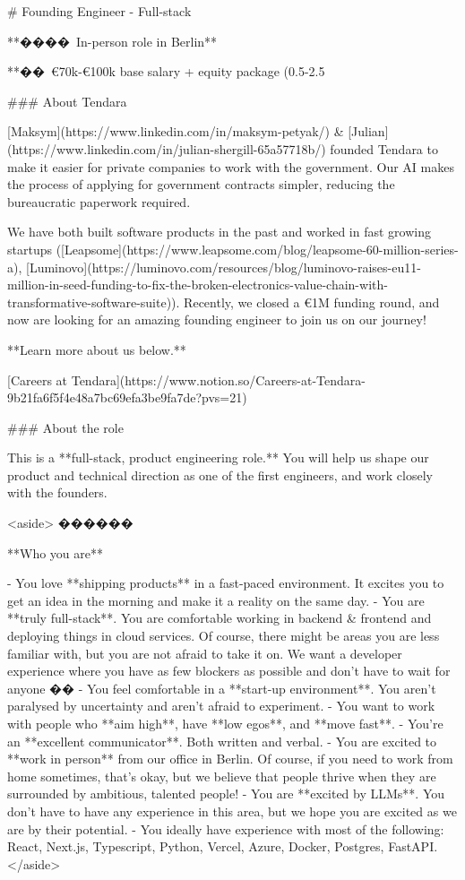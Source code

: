 # Founding Engineer - Full-stack

**���� In-person role in Berlin**

**�� €70k-€100k base salary + equity package (0.5-2.5%

### About Tendara

[Maksym](https://www.linkedin.com/in/maksym-petyak/) & [Julian](https://www.linkedin.com/in/julian-shergill-65a57718b/) founded Tendara to make it easier for private companies to work with the government. Our AI makes the process of applying for government contracts simpler, reducing the bureaucratic paperwork required.

We have both built software products in the past and worked in fast growing startups ([Leapsome](https://www.leapsome.com/blog/leapsome-60-million-series-a), [Luminovo](https://luminovo.com/resources/blog/luminovo-raises-eu11-million-in-seed-funding-to-fix-the-broken-electronics-value-chain-with-transformative-software-suite)). Recently, we closed a €1M funding round, and now are looking for an amazing founding engineer to join us on our journey!

**Learn more about us below.**

[Careers at Tendara](https://www.notion.so/Careers-at-Tendara-9b21fa6f5f4e48a7bc69efa3be9fa7de?pvs=21)

### About the role

This is a **full-stack, product engineering role.** You will help us shape our product and technical direction as one of the first engineers, and work closely with the founders. 

<aside>
����‍��

**Who you are**

- You love **shipping products** in a fast-paced environment. It excites you to get an idea in the morning and make it a reality on the same day.
- You are **truly full-stack**. You are comfortable working in backend & frontend and deploying things in cloud services. Of course, there might be areas you are less familiar with, but you are not afraid to take it on. We want a developer experience where you have as few blockers as possible and don’t have to wait for anyone ��
- You feel comfortable in a **start-up environment**. You aren’t paralysed by uncertainty and aren’t afraid to experiment.
- You want to work with people who **aim high**, have **low egos**, and **move fast**.
- You’re an **excellent communicator**. Both written and verbal.
- You are excited to **work in person** from our office in Berlin. Of course, if you need to work from home sometimes, that’s okay, but we believe that people thrive when they are surrounded by ambitious, talented people!
- You are **excited by LLMs**. You don’t have to have any experience in this area, but we hope you are excited as we are by their potential.
- You ideally have experience with most of the following: React, Next.js, Typescript, Python, Vercel, Azure, Docker, Postgres, FastAPI.
</aside>

